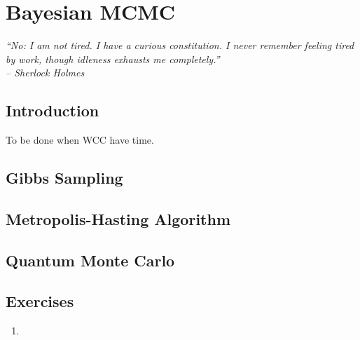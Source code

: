 
\chapter{Bayesian MCMC}
\label{chp:mcmc}

{\it
``No: I am not tired. I have a curious constitution. I never remember
feeling tired by work, though idleness exhausts me completely.'' \\
\--- Sherlock Holmes
}


\section{Introduction}

To be done when WCC have time.



\section{Gibbs Sampling}




\section{Metropolis-Hasting Algorithm}




\section{Quantum Monte Carlo}




\section{Exercises}
\label{sec:mle_exercise}

\begin{enumerate}[label=\thechapter-\arabic*]

\item


\end{enumerate}

